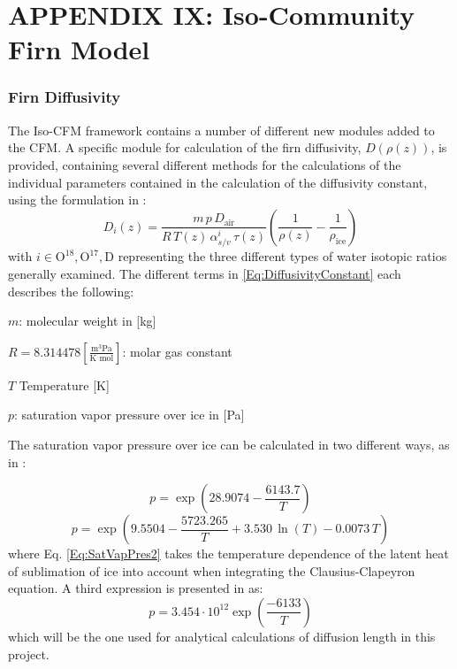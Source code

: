 \documentclass[../../CompleteThesis2/Complete_2ndDraft.tex]{subfiles}
\begin{document}
	\newpage
	\section[Appendix IX]{APPENDIX IX: Iso-Community Firn Model}
	\label{AppIX:CFM}
	
	
	\subsubsection[Diffusivity]{Firn Diffusivity}
	\label{Subsubsec:Ice_DiffusionAndDensification_IsoCFM_FirnDiffusivity}
	The Iso-CFM framework contains a number of different new modules added to the CFM. A specific module for calculation of the firn diffusivity, $D(\rho(z))$, is provided, containing several different methods for the calculations of the individual parameters contained in the calculation of the diffusivity constant, using the formulation in \cite[Johnsen et al., 2000]{Johnsen2000}:
	\begin{equation}
		D_i(z) = \frac{m\, p \, D_{\text{air}}}{R \, T(z) \, \alpha^{i}_{s/v}\, \tau(z)}\left(\frac{1}{\rho(z)} - \frac{1}{\rho_{\text{ice}}}\right)
		\label{Eq:DiffusivityConstant}
	\end{equation}
	with $i \in {\text{O}^{18}, \text{O}^{17}, \text{D}}$ representing the three different types of water isotopic ratios generally examined. The different terms in \ref{Eq:DiffusivityConstant} each describes the following:
	
	$m$: molecular weight in [kg]
	
	$R = 8.314478 \left[\frac{\text{m}^3\text{Pa}}{\text{K mol}}\right]$: molar gas constant
	
	$T$ Temperature [K]
	
	$p$: saturation vapor pressure over ice in [Pa]
	
	The saturation vapor pressure over ice can be calculated in two different ways, as in \cite[Murphy \& Koop 2005]{MurphyKoop_2005}:
	
	\begin{equation}
		p = \exp\left(28.9074 - \frac{6143.7}{T}\right)
		\label{Eq:SatVapPres1}
	\end{equation}
	\begin{equation}
		p = \exp\left(9.5504 - \frac{5723.265}{T} + 3.530\, \ln(T) - 0.0073 \, T\right)
		\label{Eq:SatVapPres2}
	\end{equation}
	where Eq. \ref{Eq:SatVapPres2} takes the temperature dependence of the latent heat of sublimation of ice into account when integrating the Clausius-Clapeyron equation.
	A third expression is presented in \cite[Johnsen et al., 2000]{Johnsen2000a} as:
	\begin{equation}
		p = 3.454 \cdot 10^{12} \exp\left(\frac{-6133}{T}\right)
		\label{Eq:SatVapPres3}
	\end{equation}
	which will be the one used for analytical calculations of diffusion length in this project.
	
\end{document}
